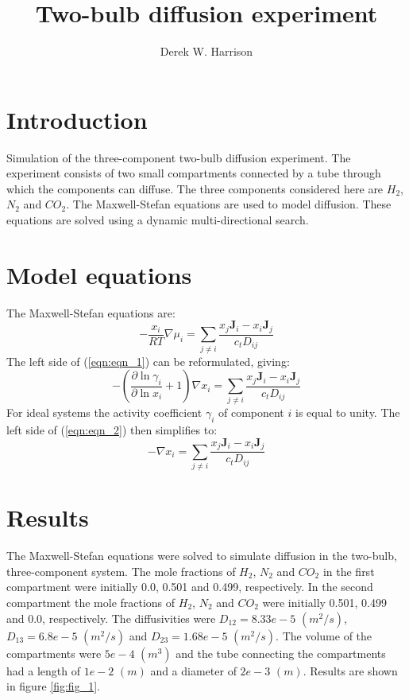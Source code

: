 \documentclass[11]{report}
\begin{document}
\author{Derek W. Harrison}
\title{Two-bulb diffusion experiment}
\maketitle

\section*{Introduction}
Simulation of the three-component two-bulb diffusion experiment. The experiment consists of two small compartments connected by a tube through which the components can diffuse. The three components considered here are $H_2$, $N_2$ and $CO_2$. The Maxwell-Stefan equations are used to model diffusion. These equations are solved using a dynamic multi-directional search.

\section*{Model equations}
The Maxwell-Stefan equations are:
\begin{equation}
\label{eqn:eqn_1}
-\frac{x_i}{RT} \nabla \mu_i = \sum_{j \neq i} \frac{x_j \textbf{J}_i - x_i \textbf{J}_j}{c_t D_{ij}}
\end{equation}
The left side of (\ref{eqn:eqn_1}) can be reformulated, giving:
\begin{equation}
\label{eqn:eqn_2}
-\left( \frac{\partial \ln{\gamma_i}}{\partial \ln{x_i}} + 1 \right) \nabla x_i = \sum_{j \neq i} \frac{x_j \textbf{J}_i - x_i \textbf{J}_j}{c_t D_{ij}}
\end{equation}
For ideal systems the activity coefficient $\gamma_i$ of component $i$ is equal to unity. The left side of (\ref{eqn:eqn_2}) then simplifies to:
\begin{equation}
\label{eqn:eqn_3}
- \nabla x_i = \sum_{j \neq i} \frac{x_j \textbf{J}_i - x_i \textbf{J}_j}{c_t D_{ij}}
\end{equation}

\section*{Results}
The Maxwell-Stefan equations were solved to simulate diffusion in the two-bulb, three-component system. The mole fractions of $H_2$, $N_2$ and $CO_2$ in the first compartment were initially 0.0, 0.501 and 0.499, respectively. In the second compartment the mole fractions of $H_2$, $N_2$ and $CO_2$ were initially 0.501, 0.499 and 0.0, respectively. The diffusivities were $D_{12} = 8.33e-5$  $(m^2/s)$, $D_{13} = 6.8e-5$ $(m^2/s)$ and $D_{23} = 1.68e-5$ $(m^2/s)$. The volume of the compartments were $5e-4$ $(m^3)$ and the tube connecting the compartments had a length of $1e-2$ $(m)$ and a diameter of $2e-3$ $(m)$. Results are shown in figure \ref{fig:fig_1}.
\end{document}
